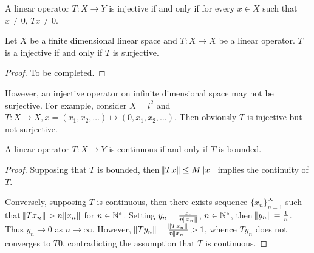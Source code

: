\begin{prop}
A linear operator $T: X \to Y$ is injective if and only if for every 
$x \in X$ such that $x \neq 0$, $Tx \neq 0$. 
\end{prop}

\begin{thm}
Let $X$ be a finite dimensional linear space and $T: X \to X$ be a linear 
operator. 
$T$ is a injective if and only if $T$ is surjective. 
\end{thm}
\begin{proof}
To be completed. 
\end{proof}
\begin{rmk}
However, an injective operator on infinite dimensional space may not be 
surjective. 
For example, consider $X = l^2$ and $T: X \to X, x = \left(x_1, x_2, 
\ldots \right) \mapsto \left(0, x_1, x_2, \ldots \right)$. 
Then obviously $T$ is injective but not surjective. 
\end{rmk}

\begin{thm}
A linear operator $T: X \to Y$ is continuous if and only if $T$ is bounded. 
\end{thm}
\begin{proof}
Supposing that $T$ is bounded, then $\norm{Tx} \le M\norm{x}$ implies the 
continuity of $T$. 

Conversely, supposing $T$ is continuous, then there exists sequence 
$\{ x_n \}_{n=1}^{\infty}$ such that $\norm{Tx_n} > n\norm{x_n}$ for 
$n \in \mathbb{N}^\ast$. 
Setting $y_n = \frac{x_n}{n \norm{x_n}}$, $n \in \mathbb{N}^\ast$, then $\norm{y_n} 
= \frac{1}{n}$. 
Thus $y_n \to 0$ as $n \to \infty$. 
However, $\norm{Ty_n} = \frac{\norm{Tx_n}}{n \norm{x_n}} > 1$, whence $Ty_n$ 
does not converges to $T0$, contradicting the assumption that $T$ is 
continuous.
\end{proof}

